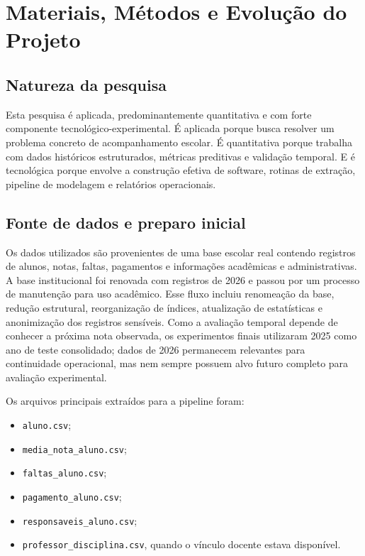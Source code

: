 \chapter{Materiais, M\'etodos e Evolu\c{c}\~ao do Projeto}
\label{cap:metodologia}

\section{Natureza da pesquisa}
\label{sec:natureza}

Esta pesquisa \'e aplicada, predominantemente quantitativa e com forte componente tecnol\'ogico-experimental. \'E aplicada porque busca resolver um problema concreto de acompanhamento escolar. \'E quantitativa porque trabalha com dados hist\'oricos estruturados, m\'etricas preditivas e valida\c{c}\~ao temporal. E \'e tecnol\'ogica porque envolve a constru\c{c}\~ao efetiva de software, rotinas de extra\c{c}\~ao, pipeline de modelagem e relat\'orios operacionais.

\section{Fonte de dados e preparo inicial}
\label{sec:fonte-dados}

Os dados utilizados s\~ao provenientes de uma base escolar real contendo registros de alunos, notas, faltas, pagamentos e informa\c{c}\~oes acad\^emicas e administrativas. A base institucional foi renovada com registros de 2026 e passou por um processo de manuten\c{c}\~ao para uso acad\^emico. Esse fluxo incluiu renomea\c{c}\~ao da base, redu\c{c}\~ao estrutural, reorganiza\c{c}\~ao de \'indices, atualiza\c{c}\~ao de estat\'isticas e anonimiza\c{c}\~ao dos registros sens\'iveis. Como a avalia\c{c}\~ao temporal depende de conhecer a pr\'oxima nota observada, os experimentos finais utilizaram 2025 como ano de teste consolidado; dados de 2026 permanecem relevantes para continuidade operacional, mas nem sempre possuem alvo futuro completo para avalia\c{c}\~ao experimental.

Os arquivos principais extra\'idos para a pipeline foram:

\begin{itemize}
    \item \texttt{aluno.csv};
    \item \texttt{media\_nota\_aluno.csv};
    \item \texttt{faltas\_aluno.csv};
    \item \texttt{pagamento\_aluno.csv};
    \item \texttt{responsaveis\_aluno.csv};
    \item \texttt{professor\_disciplina.csv}, quando o v\'inculo docente estava dispon\'ivel.
\end{itemize}

